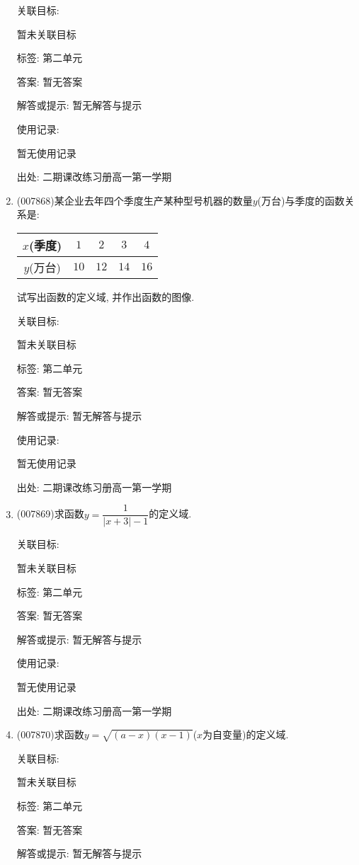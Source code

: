 \documentclass[10pt,a4paper]{article}
\begin{document}
\begin{enumerate}[1.]
关联目标:

暂未关联目标



标签: 第二单元

答案: 暂无答案

解答或提示: 暂无解答与提示

使用记录:

暂无使用记录


出处: 二期课改练习册高一第一学期
\item { (007868)}某企业去年四个季度生产某种型号机器的数量$y$(万台)与季度的函数关系是:
\begin{center}
    \begin{tabular}{|c|c|c|c|c|}
        \hline
        $x$(季度) & $1$ & $2$ & $3$ & $4$\\ \hline
        $y$(万台) & $10$ & $12$ & $14$ & $16$\\ \hline
    \end{tabular}
\end{center}
试写出函数的定义域, 并作出函数的图像.


关联目标:

暂未关联目标



标签: 第二单元

答案: 暂无答案

解答或提示: 暂无解答与提示

使用记录:

暂无使用记录


出处: 二期课改练习册高一第一学期
\item { (007869)}求函数$y=\dfrac 1{|x+3|-1}$的定义域.


关联目标:

暂未关联目标



标签: 第二单元

答案: 暂无答案

解答或提示: 暂无解答与提示

使用记录:

暂无使用记录


出处: 二期课改练习册高一第一学期
\item { (007870)}求函数$y=\sqrt {(a-x)(x-1)}$($x$为自变量)的定义域.


关联目标:

暂未关联目标



标签: 第二单元

答案: 暂无答案

解答或提示: 暂无解答与提示


\end{enumerate}
\end{document}
